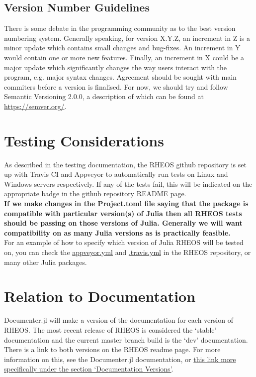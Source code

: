 \documentclass[]{article}
\newcommand{\link}[2]{{\color{blue}\href{#1}{#2}}}
\begin{document}
\subsection{Version Number Guidelines}
There is some debate in the programming community as to the best version numbering system. Generally speaking, for version X.Y.Z, an increment in Z is a minor update which contains small changes and bug-fixes. An increment in Y would contain one or more new features. Finally, an increment in X could be a major update which significantly changes the way users interact with the program, e.g. major syntax changes. Agreement should be sought with main commiters before a version is finalised. For now, we should try and follow Semantic Versioning 2.0.0, a description of which can be found at \link{https://semver.org/}{https://semver.org/}.

\section{Testing Considerations}
\label{sec:TC}
As described in the testing documentation, the RHEOS github repository is set up with Travis CI and Appveyor to automatically run tests on Linux and Windows servers respectively. If any of the tests fail, this will be indicated on the appropriate badge in the github repository README page.\\

\textbf{If we make changes in the Project.toml file saying that the package is compatible with particular version(s) of Julia then all RHEOS tests should be passing on those versions of Julia. Generally we will want compatibility on as many Julia versions as is practically feasible.}\\

For an example of how to specify which version of Julia RHEOS will be tested on, you can check the \link{https://github.com/JuliaRheology/RHEOS.jl/blob/master/appveyor.yml}{appveyor.yml} and \link{https://github.com/JuliaRheology/RHEOS.jl/blob/master/.travis.yml}{.travis.yml} in the RHEOS repository, or many other Julia packages.

\section{Relation to Documentation}
Documenter.jl will make a version of the documentation for each version of RHEOS. The most recent release of RHEOS is considered the `stable' documentation and the current master branch build is the `dev' documentation. There is a link to both versions on the RHEOS readme page. For more information on this, see the Documenter.jl documentation, or \link{https://juliadocs.github.io/Documenter.jl/stable/man/hosting/}{this link more specifically under the section `Documentation Versions'}.
\end{document}
